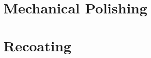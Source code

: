 \documentclass[12pt]{report}
\begin{document}
    




    \renewcommand{\abstractname}{Acknowledgements}
    \begin{abstract}

    \end{abstract}






    \chapter{Mechanical Polishing}
    

    \chapter{Recoating}
    

    
    
\end{document}
